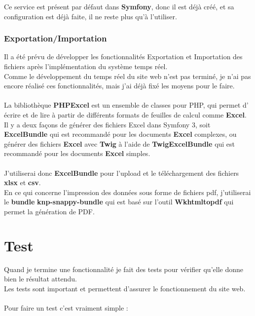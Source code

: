 \documentclass[12pt]{article}
\begin{document}
Ce service est présent par défaut dans \textbf{Symfony}, donc il est déjà créé, et sa configuration est déjà faite, il ne reste plus qu'à l'utiliser.

\subsubsection{Exportation/Importation}
 
Il a été prévu de  développer les fonctionnalités Exportation et Importation des fichiers après l'implémentation du système temps réel.\\
Comme le développement du temps réel du site web n'est pas terminé, je n'ai pas encore réalisé ces fonctionnalités, mais j'ai déjà fixé
les moyens pour le faire.\\ \\

La bibliothèque \textbf{PHPExcel} est un ensemble de classes pour  PHP, qui  permet d' écrire et de lire à partir de différents formats de feuilles de calcul comme \textbf{Excel}.\\
Il y a deux façons de générer des fichiers Excel dans Symfony 3, soit  \textbf{ExcelBundle} qui est recommandé pour les documents \textbf{Excel}  complexes,   ou  générer des fichiers \textbf{Excel} avec \textbf{Twig} à l'aide de \textbf{TwigExcelBundle}   qui est recommandé pour les documents \textbf{Excel} simples.\\
\\
J'utiliserai donc \textbf{ExcelBundle} pour l'upload et le téléchargement des fichiers \textbf{xlsx} et \textbf{csv}.\\
En ce qui concerne l'impression des données sous forme de fichiers pdf, j'utiliserai le \textbf{bundle}  \textbf{knp-snappy-bundle} qui est basé sur l'outil \textbf{Wkhtmltopdf} qui permet  la génération de PDF.\\

\newpage

\section{Test}

Quand je termine une fonctionnalité je fait des tests pour vérifier qu'elle donne bien le résultat attendu.\\
Les tests sont important et permettent d'assurer le fonctionnement du site web.\\ \\ 
Pour faire un test c'est vraiment simple :
\begin{enumerate}

\end{enumerate}
\end{document}
